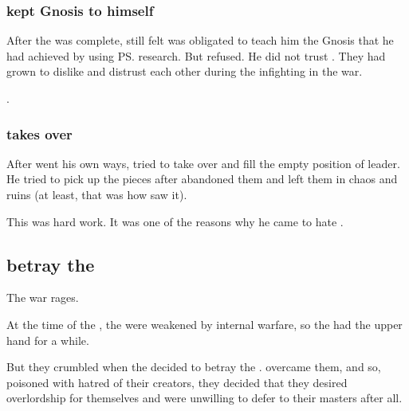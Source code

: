 \subsubsection{\Ishnaruchaefir{} kept Gnosis to himself}
After the \SecondShrouding{} was complete, \Secherdamon{} still felt \Ishnaruchaefir{} was obligated to teach him the Gnosis that he had achieved by using \ps{\Secherdamon} research. 
But \Ishnaruchaefir{} refused. 
He did not trust \Secherdamon. 
They had grown to dislike and distrust each other during the infighting in the war. 

. 





\subsubsection{\Secherdamon{} takes over}
After \Ishnaruchaefir{} went his own ways, \Secherdamon{} tried to take over and fill the empty position of leader. 
He tried to pick up the pieces after \Ishnaruchaefir{} abandoned them and left them in chaos and ruins (at least, that was how \Secherdamon{} saw it). 

This was hard work. 
It was one of the reasons why he came to hate \Ishnaruchaefir. 









\subsection{\Satharioth betray the \banelords}
The war rages. 

At the time of the \secondbanewar, the \dragons{} were weakened by internal warfare, so the \resphain{} had the upper hand for a while. 

But they crumbled when the \satharioth{} decided to betray the \banes.
 overcame them, and so, poisoned with hatred of their creators, they decided that they desired overlordship for themselves and were unwilling to defer to their \bane{} masters after all. 

